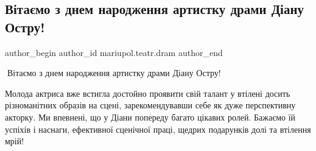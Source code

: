  
 
 
 
 

\subsection{Вітаємо з днем народження артистку драми Діану Остру!}
\label{sec:20_02_2022.fb.mariupol.teatr.dram.1.vitannja_den_narodzhenjja_artistka_dramy_diana_ostra}

\ifcmt
 author_begin
   author_id mariupol.teatr.dram
 author_end
\fi

🌺Вітаємо з днем народження артистку драми Діану Остру! 🌺

Молода актриса вже встигла достойно проявити свій талант у втілені досить
різноманітних образів на сцені, зарекомендувавши себе як дуже перспективну
акторку. Ми впевнені, що у Діани попереду багато цікавих ролей. Бажаємо їй
успіхів і наснаги, ефективної сценічної праці, щедрих подарунків долі та
втілення мрій! 💐🍾🥳

